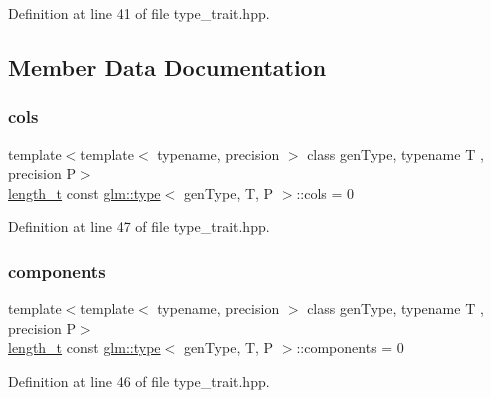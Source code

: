 Definition at line 41 of file type\+\_\+trait.\+hpp.



\subsection{Member Data Documentation}
\mbox{\label{structglm_1_1type_abe7de2b1bd7b23a03a5da5ef5e66b7f7}} 
\subsubsection{\texorpdfstring{cols}{cols}}
{\footnotesize\ttfamily template$<$template$<$ typename, precision $>$ class gen\+Type, typename T , precision P$>$ \\
\mbox{\hyperlink{namespaceglm_a090a0de2260835bee80e71a702492ed9}{length\+\_\+t}} const \mbox{\hyperlink{structglm_1_1type}{glm\+::type}}$<$ gen\+Type, T, P $>$\+::cols = 0\hspace{0.3cm}{\ttfamily [static]}}



Definition at line 47 of file type\+\_\+trait.\+hpp.

\mbox{\label{structglm_1_1type_ab7c161596abb92f6e6c6a19370d81e40}} 
\subsubsection{\texorpdfstring{components}{components}}
{\footnotesize\ttfamily template$<$template$<$ typename, precision $>$ class gen\+Type, typename T , precision P$>$ \\
\mbox{\hyperlink{namespaceglm_a090a0de2260835bee80e71a702492ed9}{length\+\_\+t}} const \mbox{\hyperlink{structglm_1_1type}{glm\+::type}}$<$ gen\+Type, T, P $>$\+::components = 0\hspace{0.3cm}{\ttfamily [static]}}



Definition at line 46 of file type\+\_\+trait.\+hpp.

\mbox{\label{structglm_1_1type_a26e1d1fef808e586b3ed70c4b182abdf}} 
